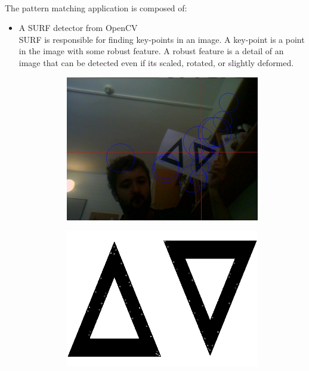 \documentclass[11pt,twoside,a4paper]{article}
\begin{document}
\paragraph {} The pattern matching application is composed of:
\begin{itemize}
  \item A SURF detector from OpenCV\\
SURF is responsible for finding key-points in an image. A key-point is a point
in the image with some robust feature. A robust feature is a detail of an image
that can be detected even if its scaled, rotated, or slightly deformed.
\begin{figure}[hbtp]
  \centering
\begin{subfigure}{.45\textwidth}
  \centering
  \includegraphics[width=.8\linewidth]{image_marked.jpg}
\end{subfigure}
\begin{subfigure}{.45\textwidth}
  \centering
  \includegraphics[width=.8\linewidth]{template_marked.jpg}
\end{subfigure}
\end{figure}



\end{itemize}
\end{document}
